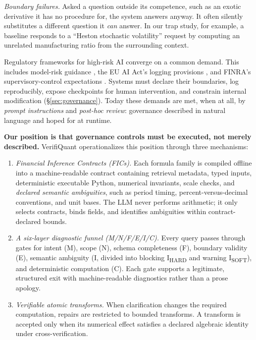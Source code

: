 \emph{Boundary failures.}
Asked a question outside its competence, such as an exotic derivative it has no procedure for, the system answers anyway.
It often silently substitutes a different question it \emph{can} answer.
In our trap study, for example, a baseline responds to a ``Heston stochastic volatility'' request by computing an unrelated manufacturing ratio from the surrounding context.

Regulatory frameworks for high-risk AI converge on a common demand.
This includes model-risk guidance \cite{fed2011sr117}, the EU AI Act's logging provisions \cite{euaiact2024}, and FINRA's supervisory-control expectations \cite{finra2020ai}.
Systems must declare their boundaries, log reproducibly, expose checkpoints for human intervention, and constrain internal modification (\S\ref{sec:governance}).
Today these demands are met, when at all, by \emph{prompt instructions} and \emph{post-hoc review}: governance described in natural language and hoped for at runtime.

\textbf{Our position is that governance controls must be executed, not merely described.}
VerifiQuant operationalizes this position through three mechanisms:

\begin{enumerate}
    \item \emph{Financial Inference Contracts (FICs).}
    Each formula family is compiled offline into a machine-readable contract containing retrieval metadata, typed inputs, deterministic executable Python, numerical invariants, scale checks, and \emph{declared semantic ambiguities}, such as period timing, percent-versus-decimal conventions, and unit bases.
    The LLM never performs arithmetic; it only selects contracts, binds fields, and identifies ambiguities within contract-declared bounds.

    \item \emph{A six-layer diagnostic funnel (M/N/F/E/I/C).}
    Every query passes through gates for intent (M), scope (N), schema completeness (F), boundary validity (E), semantic ambiguity (I, divided into blocking I\textsubscript{HARD} and warning I\textsubscript{SOFT}), and deterministic computation (C).
    Each gate supports a legitimate, structured exit with machine-readable diagnostics rather than a prose apology.

    \item \emph{Verifiable atomic transforms.}
    When clarification changes the required computation, repairs are restricted to bounded transforms.
    A transform is accepted only when its numerical effect satisfies a declared algebraic identity under cross-verification.
\end{enumerate}

